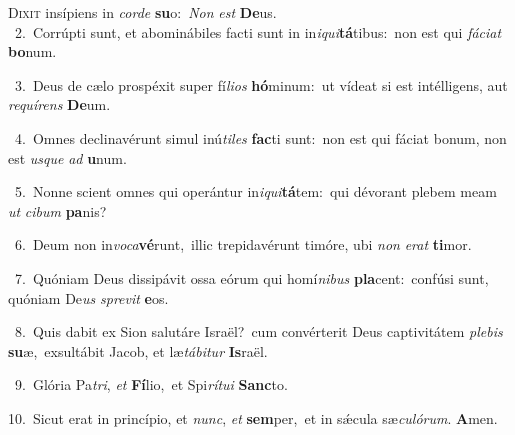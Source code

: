 \lettrine{\initial\textcolor{\initialcolor}{D}}{ixit} insípiens in \textit{cor}\-\textit{de} \textbf{su}\-o:~\star \textit{Non} \textit{est} \textbf{De}\-us.\\
{\numbfont\textcolor{\numbcolor}{~2.}}~Corrúpti sunt, et abominábiles facti sunt in in\-\textit{i}\-\textit{qui}\textbf{tá}tibus:~\star non est qui \textit{fá}\-\textit{ci}\textit{at} \textbf{bo}\-num.\par
{\numbfont\textcolor{\numbcolor}{~3.}}~Deus de cælo prospéxit super fí\-\textit{li}\-\textit{os} \textbf{hó}\-minum:~\star ut vídeat si est intélligens, aut \textit{re}\-\textit{quí}\textit{rens} \textbf{De}\-um.\par
{\numbfont\textcolor{\numbcolor}{~4.}}~Omnes declinavérunt simul inú\-\textit{ti}\-\textit{les} \textbf{fac}\-ti sunt:~\star non est qui fáciat bonum, non est \textit{us}\-\textit{que} \textit{ad} \textbf{u}\-num.\par
{\numbfont\textcolor{\numbcolor}{~5.}}~Nonne scient omnes qui operántur in\-\textit{i}\-\textit{qui}\textbf{tá}tem:~\star qui dévorant plebem meam \textit{ut} \textit{ci}\-\textit{bum} \textbf{pa}\-nis?\par
{\numbfont\textcolor{\numbcolor}{~6.}}~Deum non in\-\textit{vo}\-\textit{ca}\textbf{vé}runt,~\star illic trepidavérunt timóre, ubi \textit{non} \textit{e}\-\textit{rat} \textbf{ti}\-mor.\par
{\numbfont\textcolor{\numbcolor}{~7.}}~Quóniam Deus dissipávit ossa eórum qui homí\-\textit{ni}\-\textit{bus} \textbf{pla}\-cent:~\star confúsi sunt, quóniam De\textit{us} \textit{spre}\-\textit{vit} \textbf{e}\-os.\par
{\numbfont\textcolor{\numbcolor}{~8.}}~Quis dabit ex Sion salutáre Israël?~\dagger cum convérterit Deus captivitátem \textit{ple}\-\textit{bis} \textbf{su}\-æ,~\star exsultábit Jacob, et læ\-\textit{tá}\-\textit{bi}\textit{tur} \textbf{Is}\-raël.\par
{\numbfont\textcolor{\numbcolor}{~9.}}~Glória Pa\-\textit{tri}\-, \textit{et} \textbf{Fí}\-lio,~\star et Spi\-\textit{rí}\-\textit{tu}\textit{i} \textbf{Sanc}\-to.\par
{\numbfont\textcolor{\numbcolor}{10.}}~Sicut erat in princípio, et \textit{nunc}\-, \textit{et} \textbf{sem}\-per,~\star et in sǽcula sæ\-\textit{cu}\-\textit{ló}\textit{rum}. \textbf{A}\-men.\par
